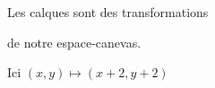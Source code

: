 \documentclass[preview]{standalone}
\begin{document}
\begin{center}
Les calques sont des transformations 
        
de notre espace-canevas. 

Ici $(x,y) \mapsto (x + 2, y + 2)$
\end{center}
\end{document}
